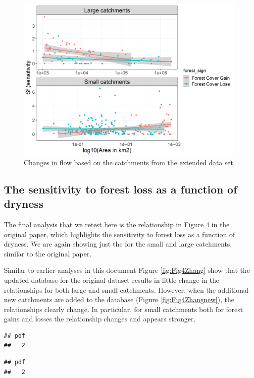 \documentclass[]{elsarticle} %
\begin{document}
\begin{figure}
\includegraphics[width=0.9\linewidth]{Fig3Zhang_all} \caption{Changes in flow based on the catchments from the extended data set}\label{fig:Fig3Zhangnew}
\end{figure}

\hypertarget{the-sensitivity-to-forest-loss-as-a-function-of-dryness}{%
\subsection{The sensitivity to forest loss as a function of dryness}\label{the-sensitivity-to-forest-loss-as-a-function-of-dryness}}

The final analysis that we retest here is the relationship in Figure 4 in the original \citet{zhang2017} paper, which highlights the sensitivity to forest loss as a function of dryness. We are again showing just the for the small and large catchments, similar to the original paper.

Similar to earlier analyses in this document Figure \ref{fig:Fig4Zhang} show that the updated database for the original dataset results in little change in the relationships for both large and small catchments. However, when the additional new catchments are added to the database (Figure \ref{fig:Fig4Zhangnew}), the relationships clearly change. In particular, for small catchments both for forest gains and losses the relationship changes and appears stronger.

\begin{verbatim}
## pdf 
##   2
\end{verbatim}

\begin{verbatim}
## pdf 
##   2
\end{verbatim}
\end{document}
